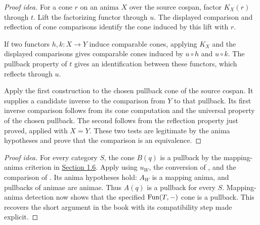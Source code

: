 \documentclass[11pt]{article}
\begin{document}
\begin{proof}[Proof idea]
For a cone $r$ on an anima $X$ over the source cospan, factor $K_X(r)$
through $t$. Lift the factorizing functor through $u$. The displayed
comparison and reflection of cone comparisons identify the cone induced by
this lift with $r$.

If two functors $h,k\colon X\to Y$ induce comparable cones, applying
$K_X$ and the displayed comparisons gives comparable cones induced by
$u\circ h$ and $u\circ k$. The pullback property of $t$ gives an
identification between these functors, which reflects through $u$.

Apply the first construction to the chosen pullback cone of the source
cospan. It supplies a candidate inverse to the comparison from $Y$ to that
pullback. Its first inverse comparison follows from its cone computation
and the universal property of the chosen pullback. The second follows from
the reflection property just proved, applied with $X=Y$. These two tests
are legitimate by the anima hypotheses and prove that the comparison is an
equivalence.
\end{proof}

\begin{proof}[Proof idea]
For every category $S$, the cone $B(q)$ is a pullback by the mapping-anima
criterion in \href{pullbacks.html}{Section 1.6}. Apply
 using $u_W$, the conversion of
, and the comparison of
. Its anima hypotheses hold:
$A_W$ is a mapping anima, and pullbacks of animae are animae. Thus $A(q)$
is a pullback for every $S$. Mapping-anima detection now shows that the
specified $\operatorname{Fun}(T,-)$ cone is a pullback. This recovers the short argument
in the book with its compatibility step made explicit.
\end{proof}
\end{document}
